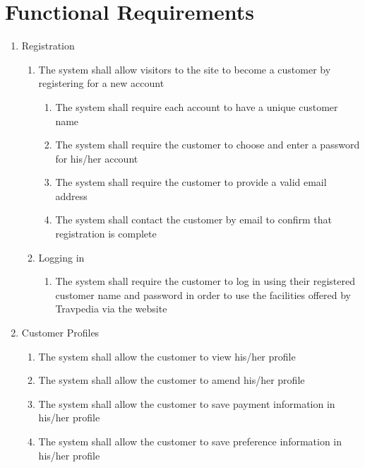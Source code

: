 \documentclass{article}
\begin{document}
\section{Functional Requirements}
\label{sec:functional_requirements}

\begin{enumerate}
	\item Registration
	\begin{enumerate}

		\item The system shall allow visitors to the site to become a customer by registering for a new account
		\begin{enumerate}
			\item The system shall require each account to have a unique customer name
			\item The system shall require the customer to choose and enter a password for his/her account
			\item The system shall require the  customer to provide a valid email address
			\item The system shall contact the customer by email to confirm that registration is complete
		\end{enumerate}

		\item Logging in
		\begin{enumerate}
			\item The system shall require the customer to log in using their registered customer name and password in order to use the facilities offered by Travpedia via the website
		\end{enumerate}
	\end{enumerate}

	\item Customer Profiles
	\begin{enumerate}
		\item The system shall allow the customer to view his/her profile
		\item The system shall allow the customer to amend his/her profile
		\item The system shall allow the customer to save payment information in his/her profile
		\item The system shall allow the customer to save preference information in his/her profile
	\end{enumerate}


\end{enumerate}
\end{document}
